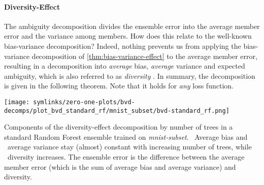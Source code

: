 \documentclass[../main.tex]{subfiles}
\begin{document}
%     


\paragraph{Diversity-Effect} The ambiguity decomposition divides the ensemble error into the average member error and the variance among members. How does this relate to the well-known bias-variance decomposition? Indeed, nothing prevents us from applying the bias-variance decomposition of \cref{thm:bias-variance-effect} to the average member error, resulting in a decomposition into \textit{average} bias, \textit{average} variance and expected ambiguity, which is also referred to as \textit{diversity} \cite{wood_UnifiedTheoryDiversity_2023}.
In summary, the decomposition is given in the following theorem. Note that it holds for \textit{any} loss function. 

\begin{marginfigure}
    \texttt{[image: symlinks/zero-one-plots/bvd-decomps/plot\_bvd\_standard\_rf/mnist\_subset/bvd-standard\_rf.png]}
    \label{fig:spambase-standard-rf-classifier-bvd}
    \caption{
        Components of the diversity-effect decomposition by number of trees in a standard Random Forest ensemble trained on \textit{mnist-subset}. \avgBiasCircle~Average bias and \avgVarianceCircle~average variance stay (almost) constant with increasing number of trees, while \diversityCircle~diversity increases. The ensemble error is the difference between the average member error (which is the sum of average bias and average variance) and diversity.
    }
\end{marginfigure}
\end{document}
